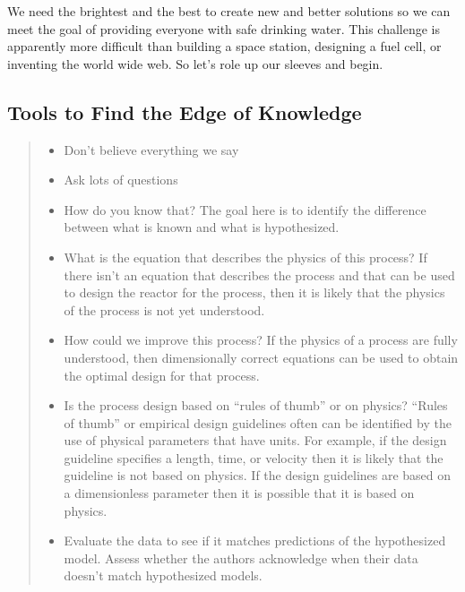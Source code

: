 \documentclass[letterpaper,10pt,english]{sphinxmanual}
\begin{document}
We need the brightest and the best to create new and better solutions so we can meet the goal of providing everyone with safe drinking water. This challenge is apparently more difficult than building a space station, designing a fuel cell, or inventing the world wide web. So let’s role up our sleeves and begin.


\subsection{Tools to Find the Edge of Knowledge}
\label{\detokenize{Introduction/Introduction:tools-to-find-the-edge-of-knowledge}}\label{\detokenize{Introduction/Introduction:heading-tools-to-find-the-edge-of-knowledge}}\begin{quote}
\begin{itemize}
\item {} 
Don’t believe everything we say

\item {} 
Ask lots of questions

\end{itemize}
\begin{itemize}
\item {} 
How do you know that? The goal here is to identify the difference between what is known and what is hypothesized.

\item {} 
What is the equation that describes the physics of this process? If there isn’t an equation that describes the process and that can be used to design the reactor for the process, then it is likely that the physics of the process is not yet understood.

\item {} 
How could we improve this process? If the physics of a process are fully understood, then dimensionally correct equations can be used to obtain the optimal design for that process.

\item {} 
Is the process design based on “rules of thumb” or on physics? “Rules of thumb” or empirical design guidelines often can be identified by the use of physical parameters that have units. For example, if the design guideline specifies a length, time, or velocity then it is likely that the guideline is not based on physics. If the design guidelines are based on a dimensionless parameter then it is possible that it is based on physics.

\end{itemize}
\begin{itemize}
\item {} 
Evaluate the data to see if it matches predictions of the hypothesized model. Assess whether the authors acknowledge when their data doesn’t match hypothesized models.


\end{itemize}
\end{quote}
\end{document}
